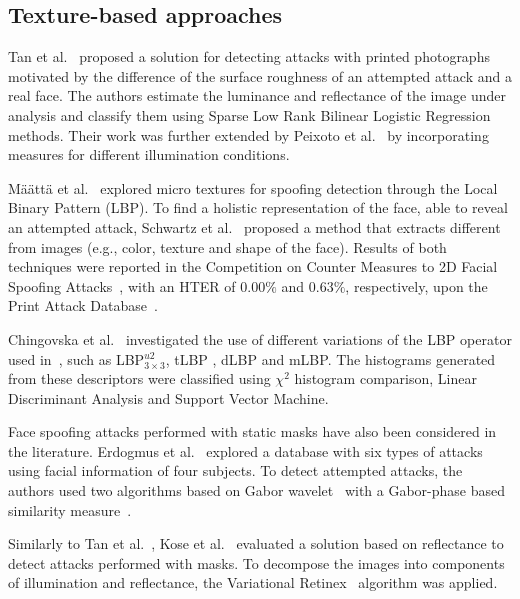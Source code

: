 \subsection{Texture-based approaches}
Tan et al.~\cite{Tan:ECCV:2010} proposed a solution for detecting attacks with printed photographs motivated by the difference of the surface roughness of an attempted attack and a real face. The authors estimate the luminance and reflectance of the image under analysis and classify them using Sparse Low Rank Bilinear Logistic Regression methods. Their work was further extended by Peixoto et al.~\cite{Peixoto:ICIP:2011} by incorporating measures for different illumination conditions.

M\"{a}\"{a}tt\"{a} et al.~\cite{Maatta:IJCB:2011} explored micro textures for spoofing detection through the Local Binary Pattern (LBP). To find a holistic representation of the face, able to reveal an attempted attack, Schwartz et al.~\cite{Schwartz:IJCB:2011} proposed a method that extracts different  from images (e.g., color, texture and shape of the face). Results of both techniques were reported in the Competition on Counter Measures to 2D Facial Spoofing Attacks~\cite{Chakka:IJCB:2011}, with an HTER of $0.00\%$ and $0.63\%$, respectively, upon the Print Attack Database~\cite{Anjos:IJCB:2011}.

Chingovska et al.~\cite{Chingovska:BIOSEG:2012} investigated the use of different variations of the LBP operator used in~\cite{Maatta:IJCB:2011}, such as LBP$^{u2}_{3 \times 3}$, tLBP , dLBP and mLBP. The histograms generated from these descriptors were classified using $\chi^{2}$ histogram comparison, Linear Discriminant Analysis and Support Vector Machine. 

Face spoofing attacks performed with static masks have also been considered in the literature. Erdogmus et al.~\cite{Erdogmus:BIOSIG:2013} explored a database with six types of attacks using facial information of four subjects. To detect attempted attacks, the authors used two algorithms based on Gabor wavelet~\cite{Zhang:ICCV:2005, Wiskott:TPAMI:1997} with a Gabor-phase based similarity measure~\cite{Gunther:ICANN:2012}. 


Similarly to Tan et al.~\cite{Tan:ECCV:2010}, Kose et al.~\cite{Kose:DSP:2013} evaluated a solution based on reflectance to detect attacks performed with masks. To decompose the images into components of illumination and reflectance, the Variational Retinex~\cite{Almoussa:UCLA:2009} algorithm was applied.

